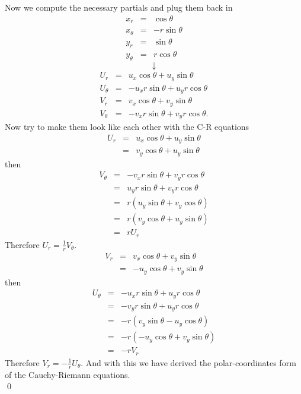 \documentclass[10pt]{amsart}
\theoremstyle{nonumberplain}
\begin{document}
\begin{enumerate}[label={\bf {\arabic*}:}]
Now we compute the necessary partials and plug them back in
\begin{eqnarray*}
x_r &=& \cos \theta \\
x_\theta &=& - r \sin \theta \\
y_r &=& \sin \theta \\
y_\theta &=& r \cos \theta
\end{eqnarray*}
$$\downarrow$$
\begin{eqnarray*}
U_r &=& u_x \cos \theta + u_y \sin \theta \\
U_\theta &=& - u_x r \sin \theta + u_y r \cos \theta \\
V_r &=& v_x \cos \theta  + v_y  \sin \theta \\
V_\theta &=& - v_x r \sin \theta + v_y r \cos \theta.
\end{eqnarray*}
Now try to make them look like each other with the C-R equations
\begin{eqnarray*}
U_r &=& u_x \cos \theta + u_y \sin \theta \\
       &=& v_y \cos \theta + u_y \sin \theta
\end{eqnarray*}
then
\begin{eqnarray*}
V_\theta &=& - v_x r \sin \theta + v_y r \cos \theta \\
	      &=&  u_y r \sin \theta + v_y r \cos \theta \\
	      &=&  r (u_y \sin \theta + v_y \cos \theta ) \\
	      &=&  r (v_y \cos \theta + u_y \sin \theta) \\
	      &=&  r U_r
\end{eqnarray*}
Therefore $U_r = \frac{1}{r}V_\theta$.
\begin{eqnarray*}
V_r &=& v_x \cos \theta  + v_y  \sin \theta \\
       &=& -u_y \cos \theta  + v_y  \sin \theta
\end{eqnarray*}
then
\begin{eqnarray*}
U_\theta &=& - u_x r \sin \theta + u_y r \cos \theta \\
	      &=& - v_y r \sin \theta + u_y r \cos \theta \\
	      &=& - r (v_y \sin \theta - u_y \cos \theta) \\
	      &=& - r (- u_y \cos \theta + v_y \sin \theta) \\
	      &=& - r V_r
\end{eqnarray*}
Therefore $V_r = - \frac{1}{r}U_\theta$.
And with this we have derived the polar-coordinates form of the Cauchy-Riemann equations. \\
\qed
\end{enumerate}
\end{document}
